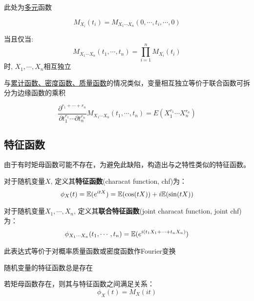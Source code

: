 \begin{remark}
    此处为\underline{多元}函数
\end{remark}

\begin{proposition}
    \[ M_{X_i}(t_i) = M_{X_1\cdots X_n}(0,\cdots ,t_i,\cdots ,0) \]
\end{proposition}

\begin{theorem}
    当且仅当:
    \[ M_{X_1\cdots X_n}(t_1,\cdots ,t_n) = \prod_{i=1}^n M_{X_i}(t_i) \]
    时, $X_1,\cdots, X_n$相互独立
\end{theorem}

\begin{remark}
    与\underline{累计函数、密度函数、质量函数}的情况类似，变量相互独立等价于联合函数可拆分为边缘函数的乘积
\end{remark}

\begin{theorem}
    \[ \frac{\partial^{r_1+\cdots +r_n} }{\partial t_1^{r_1} \cdots  \partial t_n^{r_n}} M_{X_1\cdots X_n}(t_1,\cdots ,t_n) = E(X_1^{r_1} \cdots X_n^{r_n}) \]
\end{theorem}

\subsection{特征函数}

由于有时矩母函数可能不存在，为避免此缺陷，构造出与之特性类似的特征函数。

\begin{definition}
    对于随机变量$X$, 定义其\textbf{特征函数}(characat function, chf)为：
    \[ \phi_X(t) = \mathbb{E}(e^{itX}) = \mathbb{E}(\cos (tX)) + i\mathbb{E}(\sin (tX))\]

    对于随机变量$X_1,\cdots, X_n$, 定义其\textbf{联合特征函数}(joint characat function, joint chf)为：
    \[ \phi_{X_1\cdots X_n}(t_1,\cdots ,t_n) = \mathbb{E}(e^{i (t_1 X_1+\cdots + t_n X_n)}) \]
\end{definition}

\begin{remark}
    此表达式等价于对概率质量函数或密度函数作Fourier变换
\end{remark}

\begin{proposition}
    随机变量的特征函数总是存在
\end{proposition}

\begin{proposition}
    若矩母函数存在，则其与特征函数之间满足关系：
    \[ \phi_X(t) = M_X(it) \]
\end{proposition}

